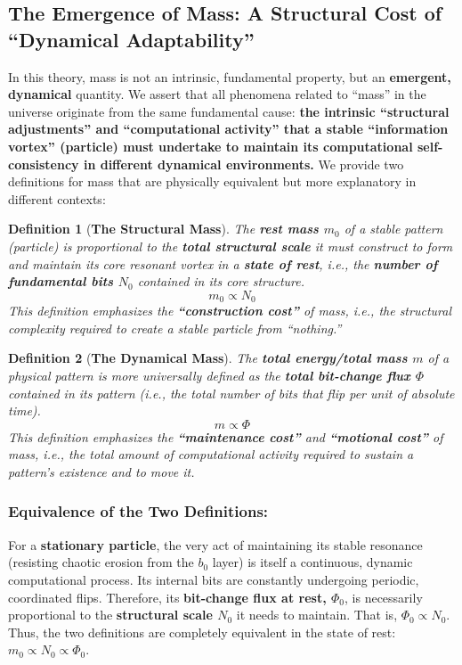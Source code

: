\documentclass[11pt, a4paper]{article}
\newtheorem{definition}{Definition}[section]
\begin{document}
\subsection{The Emergence of Mass: A Structural Cost of ``Dynamical Adaptability''}

In this theory, mass is not an intrinsic, fundamental property, but an \textbf{emergent, dynamical} quantity. We assert that all phenomena related to ``mass'' in the universe originate from the same fundamental cause: \textbf{the intrinsic ``structural adjustments'' and ``computational activity'' that a stable ``information vortex'' (particle) must undertake to maintain its computational self-consistency in different dynamical environments.}
We provide two definitions for mass that are physically equivalent but more explanatory in different contexts:

\begin{definition}[\textbf{The Structural Mass}]
The \textbf{rest mass $m_0$} of a stable pattern (particle) is proportional to the \textbf{total structural scale} it must construct to form and maintain its core resonant vortex in a \textbf{state of rest}, i.e., the \textbf{number of fundamental bits $N_0$} contained in its core structure.
\[
m_0 \propto N_0
\]
This definition emphasizes the \textbf{``construction cost''} of mass, i.e., the structural complexity required to create a stable particle from ``nothing.''
\end{definition}

\begin{definition}[\textbf{The Dynamical Mass}]
The \textbf{total energy/total mass $m$} of a physical pattern is more universally defined as the \textbf{total bit-change flux $\Phi$} contained in its pattern (i.e., the total number of bits that flip per unit of absolute time).
\[
m \propto \Phi
\]
This definition emphasizes the \textbf{``maintenance cost''} and \textbf{``motional cost''} of mass, i.e., the total amount of computational activity required to sustain a pattern's existence and to move it.
\end{definition}

\subsubsection*{Equivalence of the Two Definitions:}
For a \textbf{stationary particle}, the very act of maintaining its stable resonance (resisting chaotic erosion from the $b_0$ layer) is itself a continuous, dynamic computational process. Its internal bits are constantly undergoing periodic, coordinated flips. Therefore, its \textbf{bit-change flux at rest, $\Phi_0$}, is necessarily proportional to the \textbf{structural scale $N_0$} it needs to maintain. That is, $\Phi_0 \propto N_0$.
Thus, the two definitions are completely equivalent in the state of rest: \textbf{$m_0 \propto N_0 \propto \Phi_0$}.
\end{document}
